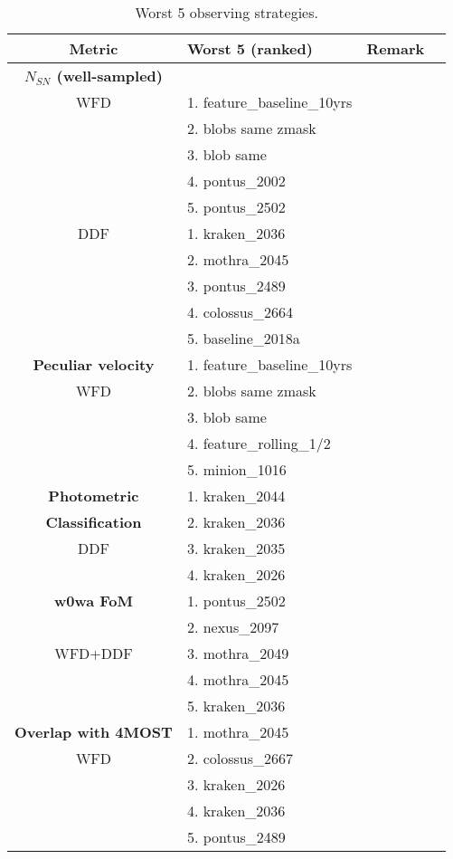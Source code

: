 \begin{table}[!htbp]
  \begin{center}
    \caption{Worst 5 observing strategies.}\label{tab:summary_worst}
\begin{tabular}{clcc}
  \hline
  \hline
Metric  & Worst 5 (ranked) & Remark \\
\hline
\hline
{\bf $N_{SN}$ (well-sampled)}  &  & \\
WFD   & 1. feature\_baseline\_10yrs & \\
             & 2. blobs same zmask & \\
             & 3. blob same &  \\
& 4. pontus\_2002 & \\
& 5. pontus\_2502 & \\
DDF    & 1. kraken\_2036 &  \\
& 2. mothra\_2045 &  \\
& 3. pontus\_2489 & \\
& 4. colossus\_2664 &  \\
& 5. baseline\_2018a &  \\
\hline
{\bf Peculiar velocity} & 1. feature\_baseline\_10yrs &\\
      WFD                & 2. blobs same zmask &  \\
                               & 3. blob same &  \\
      & 4. feature\_rolling\_1/2 & \\
      & 5. minion\_1016 & \\
      \hline
{\bf Photometric}   & 1. kraken\_2044 &  \\
{\bf Classification}  & 2. kraken\_2036 &  \\
      DDF             & 3. kraken\_2035 &  \\
                               & 4. kraken\_2026 &  \\
      \hline
          {\bf w0wa FoM}  & 1. pontus\_2502 &  \\
& 2. nexus\_2097 & \\
      WFD+DDF             & 3. mothra\_2049 &  \\
      & 4. mothra\_2045 &  \\
      & 5. kraken\_2036 &  \\
      \hline
 {\bf Overlap with 4MOST}  & 1. mothra\_2045 &  \\
     WFD       & 2. colossus\_2667 & \\
                   & 3. kraken\_2026 &  \\
      & 4. kraken\_2036 &  \\
      & 5. pontus\_2489 &  \\
     \hline
\end{tabular}
\end{center}
\end{table}
